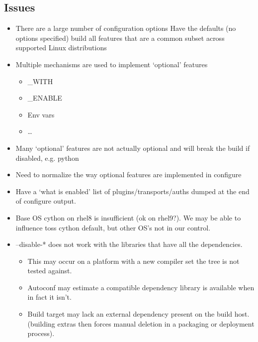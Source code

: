 \documentclass{article}
\begin{document}
\subsection{Issues}
    \begin{itemize}
        \item There are a large number of configuration options Have the defaults (no options specified) build all features that are a common subset across supported Linux distributions
        \item Multiple mechanisms are used to implement ‘optional’ features
            \begin{itemize}
                \item \_WITH
                \item \_ENABLE
                \item Env vars
                \item …
            \end{itemize}
        \item Many ‘optional’ features are not actually optional and will break the build if disabled, e.g. python
        \item Need to normalize the way optional features are implemented in configure
        \item Have a ‘what is enabled’ list of plugins/transports/auths dumped at the end of configure output. 
        \item Base OS cython on rhel8 is insufficient (ok on rhel9?). We may be able to influence toss cython default, but other OS’s not in our control.
        \item –disable-* does not work with the libraries that have all the dependencies.
            \begin{itemize}
                \item This may occur on a platform with a new compiler set the tree is not tested against.
                \item Autoconf may estimate a compatible dependency library is available when in fact it isn’t.
                \item Build target may lack an external dependency present on the build host. (building extras then forces manual deletion in a packaging or deployment process).
            \end{itemize}
    \end{itemize}
\end{document}

